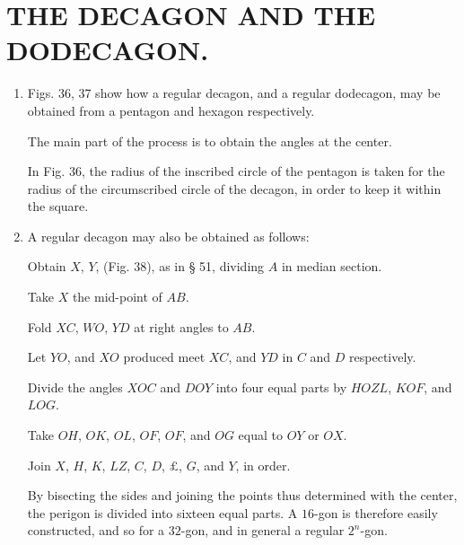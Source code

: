 
\chapter{THE DECAGON AND THE DODECAGON.}



\begin{enumerate}

\item Figs. 36, 37 show how a regular decagon, and a regular dodecagon, may be
    obtained from a pentagon and hexagon respectively.

%
%
%
    The main part of the process is to obtain the angles at the center.

    In Fig. 36, the radius of the inscribed circle of the pentagon is taken for
    the radius of the circumscribed circle of the decagon, in order to keep it
    within the square.

\item A regular decagon may also be obtained as follows:

    Obtain $X$, $Y$, (Fig. 38), as in § 51, dividing $A$ in median section.

    Take $X$ the mid-point of $AB$.

    Fold $XC$, $WO$, $YD$ at right angles to $AB$.




    Let $YO$, and $XO$ produced meet $XC$, and $YD$ in $C$ and $D$ respectively.

    Divide the angles $XOC$ and $DOY$ into four equal parts by $HOZL$, $KOF$, 
    and $LOG$.

    Take $OH$, $OK$, $OL$, $OF$, $OF$, and $OG$ equal to $OY$ or $OX$.

    Join $X$, $H$, $K$, $LZ$, $C$, $D$, $£$, $G$, and $Y$, in order.



    By bisecting the sides and joining the points thus determined with the
    center, the perigon is divided into sixteen equal parts. A $16$-gon is
    therefore easily constructed, and so for a $32$-gon, and in general a
    regular $2^n$-gon.
    
\end{enumerate}

